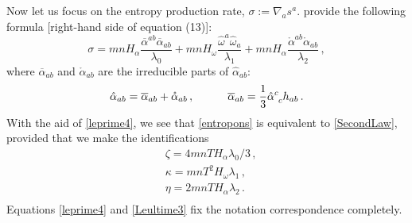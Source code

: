 \documentclass[a4paper, amsfonts, amssymb, amsmath, reprint, showkeys, nofootinbib, twoside, onecolumn, notitlepage]{revtex4-1}
\newcommand{\spc}{\quad \quad \quad}
\theoremstyle{definition}
\theoremstyle{theorem}
\begin{document}
Now let us focus on the entropy production rate, $\sigma:= \nabla_a s^a$. \citet{Stricker2019} provide the following formula [right-hand side of equation (13)]:
\begin{equation}\label{entropons}
\sigma = mnH_\alpha \dfrac{\overline{\alpha}^{ab}\overline{\alpha}_{ab}}{\lambda_0} + mnH_\omega \dfrac{\hat{\omega}^a \hat{\omega}_a}{\lambda_1} + mnH_\alpha \dfrac{\mathring{\alpha}^{ab}\mathring{\alpha}_{ab}}{\lambda_2} \, ,
\end{equation}
where $\overline{\alpha}_{ab}$ and $\mathring{\alpha}_{ab}$ are the irreducible parts of $\hat{\alpha}_{ab}$:
\begin{equation}
\hat{\alpha}_{ab}= \overline{\alpha}_{ab}+\mathring{\alpha}_{ab} \, ,  \spc  \overline{\alpha}_{ab} = \dfrac{1}{3}\hat{\alpha}\indices{^c _c}h_{ab} \, .
\end{equation}
With the aid of \eqref{leprime4}, we see that \eqref{entropons} is equivalent to \eqref{SecondLaw}, provided that we make the identifications
\begin{equation}\label{Leultime3}
\begin{split}
& \zeta = 4mnTH_\alpha \lambda_0 /3 \, , \\
& \kappa = mnT^2 H_\omega \lambda_1  \, ,\\
& \eta = 2mnT H_\alpha \lambda_2 \, . \\
\end{split}
\end{equation}
Equations \eqref{leprime4} and \eqref{Leultime3} fix the notation correspondence completely. 
\end{document}
